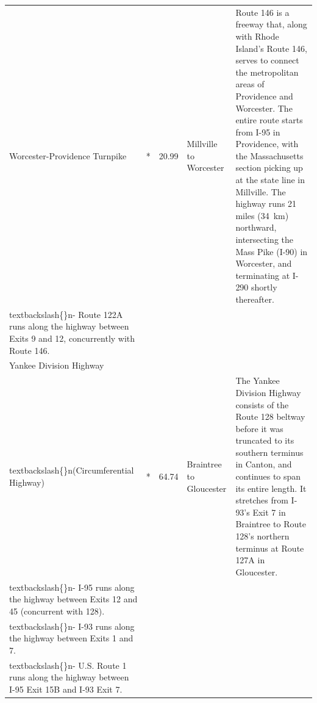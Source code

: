 \documentclass{article}
\begin{document}
\begin{tabular}{lllll}
Worcester-Providence Turnpike & * & 20.99 & Millville to Worcester & Route 146 is a freeway that, along with Rhode Island's Route 146, serves to connect the metropolitan areas of Providence and Worcester. The entire route starts from I-95 in Providence, with the Massachusetts section picking up at the state line in Millville. The highway runs 21 miles (34 km) northward, intersecting the Mass Pike (I-90) in Worcester, and terminating at I-290 shortly thereafter.\\textbackslash\{\}n- Route 122A runs along the highway between Exits 9 and 12, concurrently with Route 146. \\
Yankee Division Highway\\textbackslash\{\}n(Circumferential Highway) & * & 64.74 & Braintree to Gloucester & The Yankee Division Highway consists of the Route 128 beltway before it was truncated to its southern terminus in Canton, and continues to span its entire length. It stretches from I-93's Exit 7 in Braintree to Route 128's northern terminus at Route 127A in Gloucester.\\textbackslash\{\}n- I-95 runs along the highway between Exits 12 and 45 (concurrent with 128).\\textbackslash\{\}n- I-93 runs along the highway between Exits 1 and 7.\\textbackslash\{\}n- U.S. Route 1 runs along the highway between I-95 Exit 15B and I-93 Exit 7. \\
\bottomrule
\end{tabular}
\end{document}
